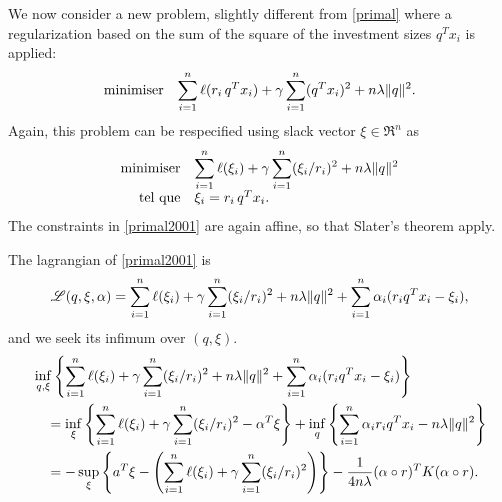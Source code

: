 We now consider a new problem, slightly different from \eqref{primal} where a
regularization based on the sum of the square of the investment sizes $q^Tx_i$ is applied:
\begin{equation}
  \label{primal2000}
  \begin{array}{ll}\operatorname*{minimiser} & \displaystyle{\sum_{i=1}^n\ell(r_i\,q^Tx_i) + \gamma\sum_{i=1}^n(q^Tx_i)^2 + n\lambda\|q\|^2.}\end{array}
\end{equation}
Again, this problem can be respecified using slack vector $\xi \in \Re^n$ as
\begin{align}
  \minimizeEquationSt{\label{primal2001}\sumi \ell(\xi_i) + \gamma\sumi(\xi_i/r_i)^2 + n\lambda\|q\|^2}[\xi_i = r_i\,q^Tx_i.]
\end{align}
The constraints in \eqref{primal2001} are again affine, so that Slater's theorem apply.

The lagrangian of \eqref{primal2001} is
\begin{equation}
  \mathscr{L}(q,\xi,\alpha) = \sum_{i=1}^n \ell(\xi_i) + \gamma\sum_{i=1}^n(\xi_i/r_i)^2 + n\lambda\|q\|^2 + \sum_{i=1}^n \alpha_i(r_iq^Tx_i - \xi_i),
\end{equation}
and we seek its infimum over $(q,\xi)$.
\begin{align}
  &\inf_{q,\xi} \left\{\sum_{i=1}^n \ell(\xi_i) + \gamma\sum_{i=1}^n (\xi_i/r_i)^2 + n\lambda\|q\|^2 + \sum_{i=1}^n \alpha_i(r_iq^Tx_i -
    \xi_i)\right\}\\
  &\quad =\inf_\xi\left\{\sum_{i=1}^n \ell(\xi_i) + \gamma\sum_{i=1}^n(\xi_i/r_i)^2 - \alpha^T\xi\right\} + \inf_q\left\{\sum_{i=1}^n
    \alpha_ir_iq^Tx_i - n\lambda\|q\|^2\right\}\\
  &\quad = - \sup_\xi\left\{a^T\xi - \left(\sum_{i=1}^n \ell(\xi_i) + \gamma\sum_{i=1}^n(\xi_i/r_i)^2\right)\right\}
    - \frac{1}{4n\lambda} (\alpha \circ r)^TK(\alpha \circ r)\label{this}.
\end{align}

